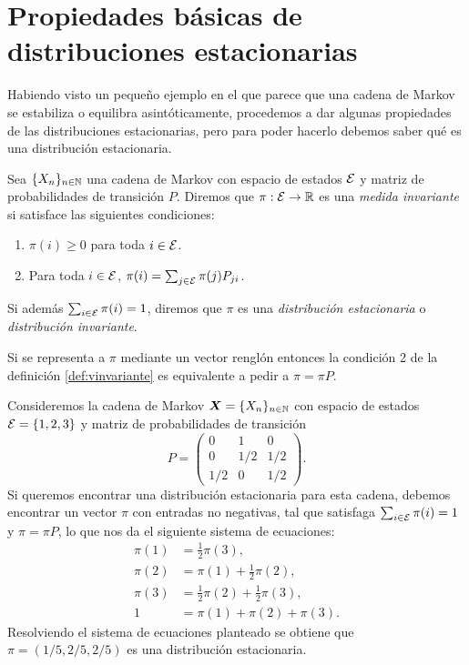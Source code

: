 \section{Propiedades básicas de distribuciones estacionarias}

\noindent Habiendo visto un pequeño ejemplo en el que parece que una cadena de Markov se estabiliza o equilibra asintóticamente, procedemos a dar algunas propiedades de las distribuciones estacionarias, pero para poder hacerlo debemos saber qué es una distribución estacionaria.

\begin{definition} \label{def:vinvariante}
    Sea $\{X_n\}_{n \in \mathbb{N}}$ una cadena de Markov con espacio de estados $\mathcal{E}$ y matriz de probabilidades de transición $P$. Diremos que $\pi : \mathcal{E} \to \mathbb{R}$ es una \emph{medida invariante} si satisface las siguientes condiciones:
    \begin{enumerate}
        \item $\pi(i) \geq 0$ para toda $i \in \mathcal{E}$.
        \item Para toda $i \in \mathcal{E}$, $\pi(i) = \sum_{j \in \mathcal{E}} \pi(j) P_{ji}$.
    \end{enumerate}
    Si además $\sum_{i \in \mathcal{E}} \pi(i) = 1$, diremos que $\pi$ es una \emph{distribución estacionaria} o \emph{distribución invariante}.
\end{definition}

Si se representa a $\pi$ mediante un vector renglón entonces la condición 2 de la definición \ref{def:vinvariante} es equivalente a pedir a $\pi = \pi P$.

\begin{example}
    Consideremos la cadena de Markov $\bm X = \{X_n\}_{n \in \mathbb{N}}$ con espacio de estados $\mathcal{E} = \{1, 2, 3\}$ y matriz de probabilidades de transición
    \[
        P = \begin{pmatrix}
            0 & 1 & 0 \\
            0 & 1/2 & 1/2 \\
            1/2 & 0 & 1/2
        \end{pmatrix}.
    \] Si queremos encontrar una distribución estacionaria para esta cadena, debemos encontrar un vector $\pi$ con entradas no negativas, tal que satisfaga 
    $\sum_{i \in \mathcal{E}} \pi(i) = 1$ y $\pi = \pi P$, lo que nos da el siguiente sistema de ecuaciones:
    \begin{align*}
        \pi(1) & = \frac 1 2 \pi(3), \\
        \pi(2) & = \pi(1) + \frac 1 2 \pi(2), \\
        \pi(3) & = \frac 1 2 \pi(2) + \frac 1 2 \pi(3), \\
         1 & = \pi(1) + \pi(2) + \pi(3).
    \end{align*}
    Resolviendo el sistema de ecuaciones planteado se obtiene que $\pi = (1/5, 2/5, 2/5)$ es una distribución estacionaria.
\end{example}

